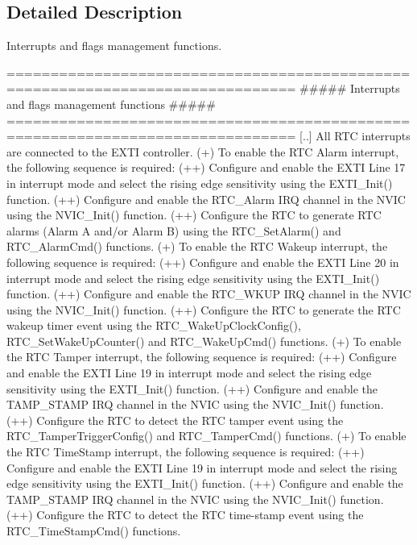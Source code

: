 \subsection{Detailed Description}
Interrupts and flags management functions. \begin{DoxyVerb} ===============================================================================
                ##### Interrupts and flags management functions #####
 ===============================================================================  
    [..] All RTC interrupts are connected to the EXTI controller.
         (+) To enable the RTC Alarm interrupt, the following sequence is required:
             (++) Configure and enable the EXTI Line 17 in interrupt mode and select 
                  the rising edge sensitivity using the EXTI_Init() function.
             (++) Configure and enable the RTC_Alarm IRQ channel in the NVIC using 
                  the NVIC_Init() function.
             (++) Configure the RTC to generate RTC alarms (Alarm A and/or Alarm B)
                  using the RTC_SetAlarm() and RTC_AlarmCmd() functions.
         (+) To enable the RTC Wakeup interrupt, the following sequence is required:
             (++) Configure and enable the EXTI Line 20 in interrupt mode and select 
                  the rising edge sensitivity using the EXTI_Init() function.
             (++) Configure and enable the RTC_WKUP IRQ channel in the NVIC using
                  the NVIC_Init() function.
             (++) Configure the RTC to generate the RTC wakeup timer event using the 
                  RTC_WakeUpClockConfig(), RTC_SetWakeUpCounter() and RTC_WakeUpCmd() 
                  functions.
         (+) To enable the RTC Tamper interrupt, the following sequence is required:
             (++) Configure and enable the EXTI Line 19 in interrupt mode and select 
                  the rising edge sensitivity using the EXTI_Init() function.
             (++) Configure and enable the TAMP_STAMP IRQ channel in the NVIC using 
                  the NVIC_Init() function.
             (++) Configure the RTC to detect the RTC tamper event using the 
                  RTC_TamperTriggerConfig() and RTC_TamperCmd() functions.
         (+) To enable the RTC TimeStamp interrupt, the following sequence is required:
             (++) Configure and enable the EXTI Line 19 in interrupt mode and select
                  the rising edge sensitivity using the EXTI_Init() function.
             (++) Configure and enable the TAMP_STAMP IRQ channel in the NVIC using 
                  the NVIC_Init() function.
             (++) Configure the RTC to detect the RTC time-stamp event using the 
                  RTC_TimeStampCmd() functions.\end{DoxyVerb}


